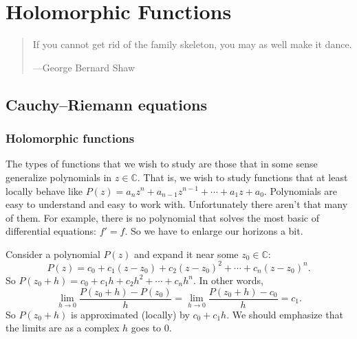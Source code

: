 \documentclass[12pt,openany]{book}
\newcommand{\C}{{\mathbb{C}}}
\theoremstyle{plain}
\theoremstyle{remark}
\theoremstyle{definition}
\newenvironment{myquote}{%
    \begin{quote}%
    \begingroup\itshape
}{%
    \endgroup%
    \end{quote}
}
\theoremstyle{exercise}
\theoremstyle{example}
\begin{document}

\chapter{Holomorphic Functions} \label{ch:holfusc}

\begin{myquote}
If you cannot get rid of the family skeleton, you may as well make it
dance.

---George Bernard Shaw
\end{myquote}


\section{Cauchy--Riemann equations}
\label{sec:holfuncs}

\subsection{Holomorphic functions}

The types of functions that we wish to study are those that in some sense
generalize polynomials in $z \in \C$.  That is, we wish to study functions that 
at least locally behave like $P(z) = a_n z^n + a_{n-1} z^{n-1} + \cdots +
a_1 z + a_0$.  Polynomials are easy to understand and easy to work
with.  Unfortunately there aren't that many of them.  For example, there is
no polynomial that solves the most basic of differential equations: $f' =
f$.  So we have to enlarge our horizons a bit.

Consider a polynomial $P(z)$ and expand it near some $z_0 \in \C$:
\begin{equation*}
P(z) = c_0 + c_1 (z-z_0) + c_2 {(z-z_0)}^2 + \cdots + c_n {(z-z_0)}^n .
\end{equation*}
So $P(z_0+h) = c_0 + c_1 h + c_2 h^2 + \cdots + c_n h^n$.
In other words,
\begin{equation*}
\lim_{h \to 0} \frac{P(z_0+h) - P(z_0)}{h} =
\lim_{h \to 0} \frac{P(z_0+h) - c_0}{h} = c_1 .
\end{equation*}
So $P(z_0+h)$ is approximated (locally) by $c_0 + c_1 h$.
We should emphasize that the limits are as a complex $h$ goes to 0.
\end{document}

